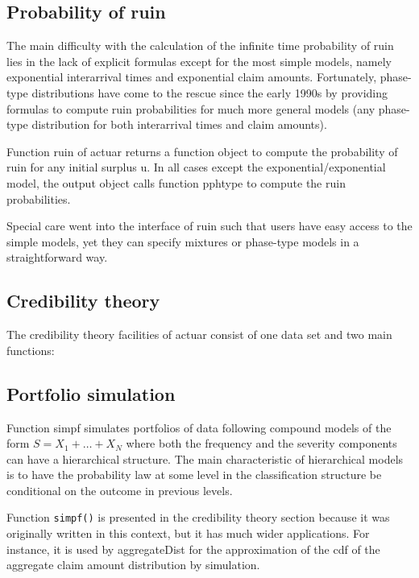 \documentclass[12pt]{article}
\begin{document}
\subsection{Probability of ruin}

The main difficulty with the calculation of the infinite time probability of ruin lies in the lack of explicit formulas except for the most simple models, namely exponential interarrival times and exponential claim amounts. Fortunately, phase-type distributions have come to the rescue since the early 1990s by providing formulas to compute ruin probabilities for much more general models (any phase-type distribution for both interarrival times and claim amounts).

Function ruin of actuar returns a function object to compute the probability of ruin for any initial surplus u. In all cases except the exponential/exponential model, the output object calls function pphtype to compute the ruin probabilities.

Special care went into the interface of ruin such that users have easy access to the simple models, yet they can specify mixtures or phase-type models in a straightforward way.

\subsection{Credibility theory}

The credibility theory facilities of actuar consist of one data set and two main functions: 

\subsection{Portfolio simulation}

Function simpf simulates portfolios of data following compound models of the form $S = X_1 + \ldots + X_N$ where both the frequency and the severity components can have a hierarchical structure. The main characteristic of hierarchical models is to have the probability law at some level in the classification structure be conditional on the outcome in previous levels.

Function \texttt{simpf()} is presented in the credibility theory section because it was originally written in this context, but it has much wider applications. For instance, it is used by aggregateDist for the approximation of the cdf of the aggregate claim amount distribution by simulation.
\end{document}
